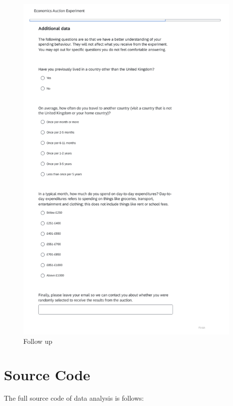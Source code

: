 \documentclass[
]{report}
\begin{document}
\begin{figure}[H]

{\centering \includegraphics{experiment_instructions/follow_up.png}

}

\caption{Follow up}

\end{figure}%

\section{Source Code}\label{source-code}

The full source code of data analysis is follows:
\end{document}
